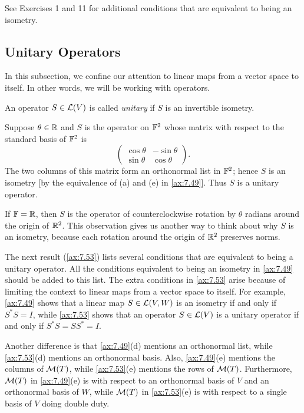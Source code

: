 See Exercises 1 and 11 for additional conditions that are equivalent to being
an isometry.

\subsection{Unitary Operators}

In this subsection, we confine our attention to linear maps from a vector space
to itself. In other words, we will be working with operators.

\begin{definition}\label{ax:7.51}
An operator $S\in\mathcal{L}(V)$ is called \emph{unitary} if $S$ is an invertible
isometry.
\end{definition}


\begin{example}[Rotation of $\R^2$]\label{ax:7.52}
Suppose $\theta\in\mathbb{R}$ and $S$ is the operator on $\mathbb{F}^2$ whose matrix with respect
to the standard basis of $\mathbb{F}^2$ is
\[ \begin{pmatrix}\cos\theta&-\sin\theta\\\sin\theta&\cos\theta\end{pmatrix}. \]
The two columns of this matrix form an orthonormal list in $\mathbb{F}^2$; hence $S$ is
an isometry [by the equivalence of (a) and (e) in \ref{ax:7.49}]. Thus $S$ is a
unitary operator.

If $\mathbb{F}=\mathbb{R}$, then $S$ is the operator of counterclockwise rotation by $\theta$
radians around the origin of $\R^2$. This observation gives us another way to
think about why $S$ is an isometry, because each rotation around the origin of
$\R^2$ preserves norms.
\end{example}

The next result (\ref{ax:7.53}) lists several conditions that are equivalent to
being a unitary operator. All the conditions equivalent to being an isometry in
\ref{ax:7.49} should be added to this list. The extra conditions in
\ref{ax:7.53} arise because of limiting the context to linear maps from a vector
space to itself. For example, \ref{ax:7.49} shows that a linear map
$S\in\mathcal{L}(V,W)$ is an isometry if and only if $S^*S=I$, while \ref{ax:7.53}
shows that an operator $S\in\mathcal{L}(V)$ is a unitary operator if and only if
$S^*S=SS^*=I$.

Another difference is that \ref{ax:7.49}(d) mentions an orthonormal list, while
\ref{ax:7.53}(d) mentions an orthonormal basis. Also, \ref{ax:7.49}(e) mentions
the columns of $\mathcal{M}(T)$, while \ref{ax:7.53}(e) mentions the rows of $\mathcal{M}(T)$.
Furthermore, $\mathcal{M}(T)$ in \ref{ax:7.49}(e) is with respect to an orthonormal
basis of $V$ and an orthonormal basis of $W$, while $\mathcal{M}(T)$ in
\ref{ax:7.53}(e) is with respect to a single basis of $V$ doing double duty.

